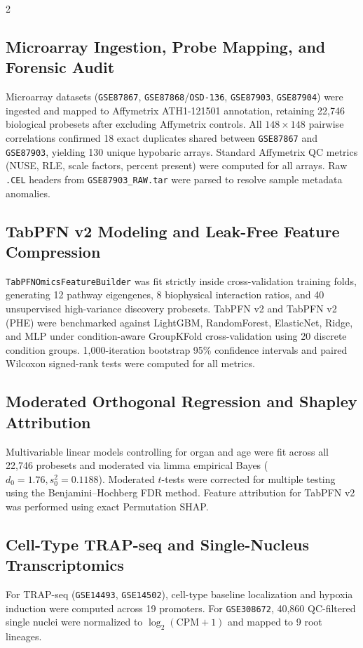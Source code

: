 \documentclass[10pt,a4paper]{article}
\begin{document}
\begin{multicols}{2}
\subsection*{Microarray Ingestion, Probe Mapping, and Forensic Audit}
Microarray datasets (\texttt{GSE87867}, \texttt{GSE87868}/\texttt{OSD-136}, \texttt{GSE87903}, \texttt{GSE87904}) were ingested and mapped to Affymetrix ATH1-121501 annotation, retaining 22,746 biological probesets after excluding Affymetrix controls. All $148 \times 148$ pairwise correlations confirmed 18 exact duplicates shared between \texttt{GSE87867} and \texttt{GSE87903}, yielding 130 unique hypobaric arrays. Standard Affymetrix QC metrics (NUSE, RLE, scale factors, percent present) were computed for all arrays. Raw \texttt{.CEL} headers from \texttt{GSE87903\_RAW.tar} were parsed to resolve sample metadata anomalies.

\subsection*{TabPFN v2 Modeling and Leak-Free Feature Compression}
\texttt{TabPFNOmicsFeatureBuilder} was fit strictly inside cross-validation training folds, generating 12 pathway eigengenes, 8 biophysical interaction ratios, and 40 unsupervised high-variance discovery probesets. TabPFN v2 and TabPFN v2 (PHE) were benchmarked against LightGBM, RandomForest, ElasticNet, Ridge, and MLP under condition-aware GroupKFold cross-validation using 20 discrete condition groups. 1,000-iteration bootstrap 95\% confidence intervals and paired Wilcoxon signed-rank tests were computed for all metrics.

\subsection*{Moderated Orthogonal Regression and Shapley Attribution}
Multivariable linear models controlling for organ and age were fit across all 22,746 probesets and moderated via limma empirical Bayes ($d_0 = 1.76, s_0^2 = 0.1188$). Moderated $t$-tests were corrected for multiple testing using the Benjamini--Hochberg FDR method. Feature attribution for TabPFN v2 was performed using exact Permutation SHAP.

\subsection*{Cell-Type TRAP-seq and Single-Nucleus Transcriptomics}
For TRAP-seq (\texttt{GSE14493}, \texttt{GSE14502}), cell-type baseline localization and hypoxia induction were computed across 19 promoters. For \texttt{GSE308672}, 40,860 QC-filtered single nuclei were normalized to $\log_2(\text{CPM}+1)$ and mapped to 9 root lineages.


\end{multicols}
\end{document}
